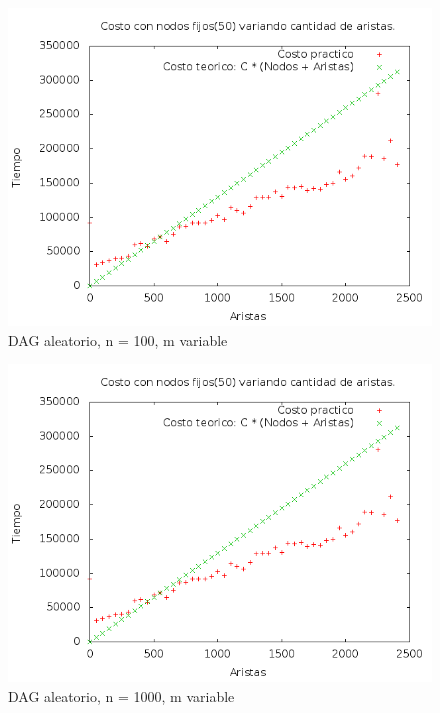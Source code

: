 
\begin{figure}[H]
	\centering
	\includegraphics[scale=0.5]{blank.png}
	\caption{DAG aleatorio, n = 100, m variable}
\end{figure}

\begin{figure}[H]
	\centering
	\includegraphics[scale=0.5]{blank.png}
	\caption{DAG aleatorio, n = 1000, m variable}
\end{figure}


